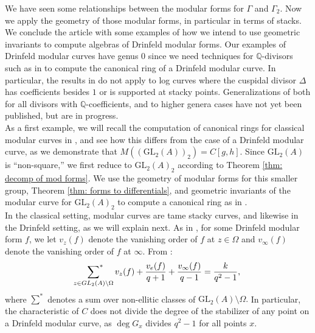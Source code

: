 \documentclass[11pt]{amsart}
\theoremstyle{definition}
\numberwithin{equation}{section}
\newcommand{\GL}{\mathrm{GL}} 	%
\newcommand{\bbQ}{\mathbb{Q}}		%
\begin{document}
We have seen some relationships between the modular forms for $\Gamma$ and $\Gamma_2.$ Now we apply the geometry of those modular forms, in particular in terms of stacks. We conclude the article with some examples of how we intend to use geometric invariants to compute algebras of Drinfeld modular forms. Our examples of Drinfeld modular curves have genus $0$ since we need techniques for $\bbQ$-divisors such as in \cite{ODorney-canonical-rings-Q-divisors-on-P1} to compute the canonical ring of a Drinfeld modular curve. In particular, the results in \cite{VZB} do not apply to log curves where the cuspidal divisor $\Delta$ has coefficients besides $1$ or is supported at stacky points. Generalizations of both \cite{VZB} for all divisors with $\bbQ$-coefficients, and \cite{ODorney-canonical-rings-Q-divisors-on-P1} to higher genera cases have not yet been published, but are in progress.\\

As a first example, we will recall the computation of canonical rings for classical modular curves in \cite{VZB}, and see how this differs from the case of a Drinfeld modular curve, as we demonstrate that $M((\GL_2(A))_2)=C[g,h].$ Since $\GL_2(A)$ is ``non-square,'' we first reduce to $\GL_2(A)_2$ according to Theorem \ref{thm: decomp of mod forms}. We use the geometry of modular forms for this smaller group, Theorem \ref{thm: forms to differentials}, and geometric invariants of the modular curve for $\GL_2(A)_2$ to compute a canonical ring as in \cite{VZB}.\\

In the classical setting, modular curves are tame stacky curves, and likewise in the Drinfeld setting, as we will explain next. As in \cite[Definition $(3.5)$]{Gekeler-survey-Drinfeld-modular-forms}, for some Drinfeld modular form $f$, we let $v_z(f)$ denote the vanishing order of $f$ at $z\in \Omega$ and $v_{\infty}(f)$ denote the vanishing order of $f$ at $\infty.$ From \cite[Equation $(3.10)$]{Gekeler-survey-Drinfeld-modular-forms}: 
\[\sideset{}{^*}\sum_{z\in GL_2(A)\setminus \Omega}v_z(f)+\frac{v_e(f)}{q+1}+\frac{v_{\infty}(f)}{q-1}=\frac{k}{q^2-1},\]
where $\sum^*$ denotes a sum over non-ellitic classes of $\GL_2(A)\setminus \Omega.$ In particular, the characteristic of $C$ does not divide the degree of the stabilizer of any point on a Drinfeld modular curve, as $\deg G_x$ divides $q^2-1$ for all points $x.$\\
\end{document}
